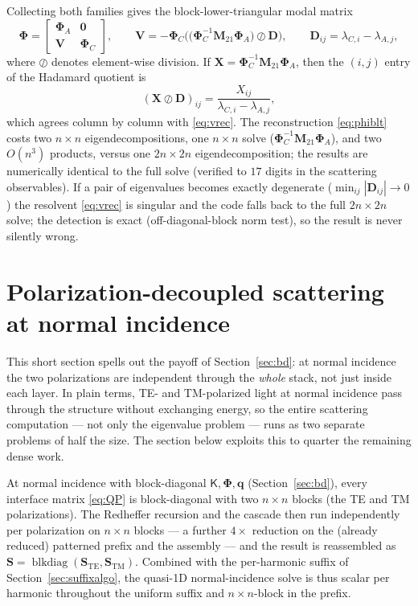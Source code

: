 \documentclass[11pt]{article}
\theoremstyle{remark}
\newcommand{\kp}{\mathsf{K}}
\newcommand{\Ph}{\mathbf{\Phi}}
\newcommand{\fq}{\mathbf{q}}
\DeclareMathOperator{\blkdiag}{blkdiag}
\begin{document}
Collecting both families gives the block-lower-triangular modal matrix
\begin{equation}
\Ph=
\begin{bmatrix}
\Ph_A & \mathbf{0}\\
\mathbf{V} & \Ph_C
\end{bmatrix},\qquad
\mathbf{V}=-\Ph_C\Big(\big(\Ph_C^{-1}\mathbf{M}_{21}\Ph_A\big)\oslash\mathbf{D}\Big),
\qquad
\mathbf{D}_{ij}=\lambda_{C,i}-\lambda_{A,j},
\label{eq:phiblt}
\end{equation}
where $\oslash$ denotes element-wise division.  If
$\mathbf{X}=\Ph_C^{-1}\mathbf{M}_{21}\Ph_A$, then the $(i,j)$ entry of the
Hadamard quotient is
\begin{equation*}
(\mathbf{X}\oslash\mathbf{D})_{ij}
=\frac{X_{ij}}{\lambda_{C,i}-\lambda_{A,j}},
\end{equation*}
which agrees column by column with \eqref{eq:vrec}. The reconstruction \eqref{eq:phiblt}
costs two $n\times n$ eigendecompositions, one $n\times n$ solve
($\Ph_C^{-1}\mathbf{M}_{21}\Ph_A$), and two $O(n^3)$ products, versus one
$2n\times2n$ eigendecomposition; the results are numerically identical to the
full solve (verified to $17$ digits in the scattering observables). If a pair
of eigenvalues becomes exactly degenerate ($\min_{ij}|\mathbf{D}_{ij}|\to0$)
the resolvent \eqref{eq:vrec} is singular and the code falls back to the full
$2n\times2n$ solve; the detection is exact (off-diagonal-block norm test), so
the result is never silently wrong.

\section{Polarization-decoupled scattering at normal incidence}
\label{sec:te}

This short section spells out the payoff of Section~\ref{sec:bd}: at normal
incidence the two polarizations are independent through the \emph{whole} stack,
not just inside each layer.  In plain terms, TE- and TM-polarized light at
normal incidence pass through the structure without exchanging energy, so the
entire scattering computation --- not only the eigenvalue problem --- runs as
two separate problems of half the size.  The section below exploits this to
quarter the remaining dense work.

At normal incidence with block-diagonal $\kp,\Ph,\fq$ (Section~\ref{sec:bd}),
every interface matrix \eqref{eq:QP} is block-diagonal with two $n\times n$
blocks (the TE and TM polarizations). The Redheffer recursion and the cascade
then run independently per polarization on $n\times n$ blocks --- a further
$4\times$ reduction on the (already reduced) patterned prefix and the
assembly --- and the result is reassembled as
$\mathbf{S}=\blkdiag(\mathbf{S}_{\mathrm{TE}},\mathbf{S}_{\mathrm{TM}})$.
Combined with the per-harmonic suffix of Section~\ref{sec:suffixalgo}, the
quasi-1D normal-incidence solve is thus scalar per harmonic throughout the
uniform suffix and $n\times n$-block in the prefix.
\end{document}

